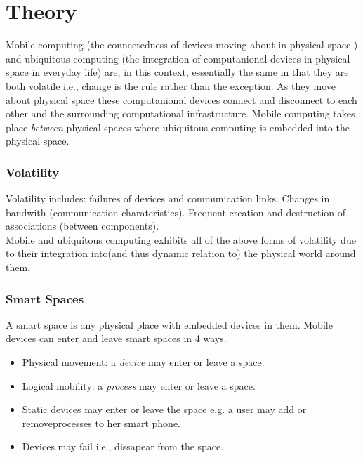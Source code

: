 \section{Theory}

Mobile computing (the connectedness of devices moving about in physical space ) and ubiquitous computing (the integration of computanional devices in physical space in everyday life) are, in this context, essentially the same in that they are both volatile i.e., change is the rule rather than the exception. As they move about physical space these computanional devices connect and disconnect to each other and the surrounding computational infrastructure. Mobile computing takes place \textit{between} physical spaces where ubiquitous computing is embedded into the physical space. \\

\begin{comment}
Because of this, mobile computing is considered 'volatile'.  \\ 
\end{comment}

\subsubsection{Volatility}
\label{volatility}
Volatility includes: failures of devices and communication links. Changes in bandwith (communication charateristics). Frequent creation and destruction of associations (between components). \\
 
Mobile and ubiquitous computing exhibits all of the above forms of volatility due to their integration into(and thus dynamic relation to) the physical world around them.\\


\subsubsection{Smart Spaces}
A smart space is any physical place with embedded devices in them. Mobile devices can enter and leave smart spaces in 4 ways.

\begin{itemize}
\item Physical movement: a \textit{device} may enter or leave a space. 
\item Logical mobility: a \textit{process} may enter or leave a space. 
\item Static devices may enter or leave the space e.g. a user may add or removeprocesses to her smart phone. 
\item Devices may fail i.e., dissapear from the space. 
\end{itemize}




